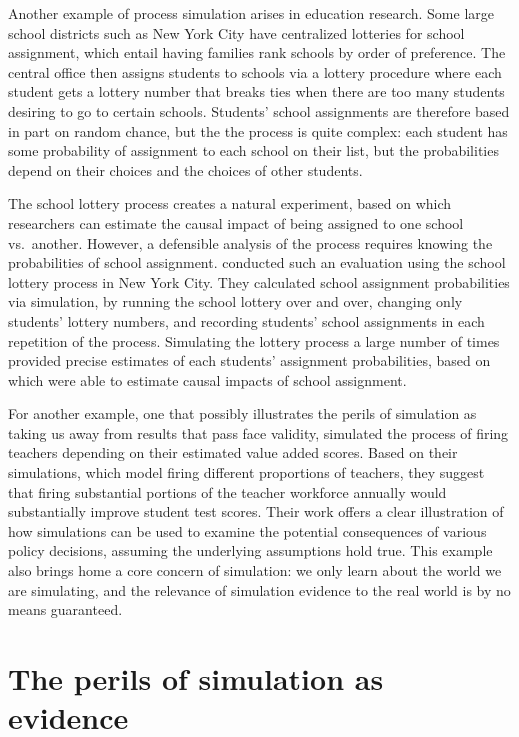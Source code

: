 \documentclass[
]{book}
\begin{document}
Another example of process simulation arises in education research.
Some large school districts such as New York City have centralized lotteries for school assignment, which entail having families rank schools by order of preference.
The central office then assigns students to schools via a lottery procedure where each student gets a lottery number that breaks ties when there are too many students desiring to go to certain schools.
Students' school assignments are therefore based in part on random chance, but the the process is quite complex: each student has some probability of assignment to each school on their list, but the probabilities depend on their choices and the choices of other students.

The school lottery process creates a natural experiment, based on which researchers can estimate the causal impact of being assigned to one school vs.~another.
However, a defensible analysis of the process requires knowing the probabilities of school assignment. \citet{abdulkadirouglu2017research} conducted such an evaluation using the school lottery process in New York City.
They calculated school assignment probabilities via simulation, by running the school lottery over and over, changing only students' lottery numbers, and recording students' school assignments in each repetition of the process.
Simulating the lottery process a large number of times provided precise estimates of each students' assignment probabilities, based on which \citet{abdulkadirouglu2017research} were able to estimate causal impacts of school assignment.

For another example, one that possibly illustrates the perils of simulation as taking us away from results that pass face validity, \citet{staiger2010searching} simulated the process of firing teachers depending on their estimated value added scores.
Based on their simulations, which model firing different proportions of teachers, they suggest that firing substantial portions of the teacher workforce annually would substantially improve student test scores.
Their work offers a clear illustration of how simulations can be used to examine the potential consequences of various policy decisions, assuming the underlying assumptions hold true.
This example also brings home a core concern of simulation: we only learn about the world we are simulating, and the relevance of simulation evidence to the real world is by no means guaranteed.

\section{The perils of simulation as evidence}\label{the-perils-of-simulation-as-evidence}
\end{document}
